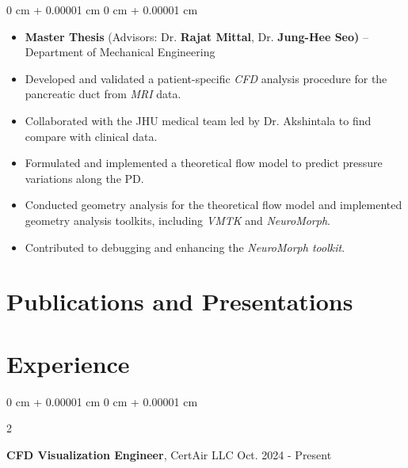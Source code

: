 \documentclass[10pt, letterpaper]{article}
\newenvironment{highlights}{
    \begin{itemize}[
        topsep=0.10 cm,
        parsep=0.10 cm,
        partopsep=0pt,
        itemsep=0pt,
        leftmargin=0 cm + 10pt
    ]
}{
    \end{itemize}
} %
\newenvironment{onecolentry}{
    \begin{adjustwidth}{
        0 cm + 0.00001 cm
    }{
        0 cm + 0.00001 cm
    }
}{
    \end{adjustwidth}
} %
\newenvironment{twocolentry}[2][]{
    \onecolentry
    \def\secondColumn{#2}
    \setcolumnwidth{\fill, 4.5 cm}
    \begin{paracol}{2}
}{ 
    \switchcolumn \raggedleft \secondColumn
    \end{paracol}
    \endonecolentry
} %
\begin{document}
    \vspace{0.10 cm}
    \begin{onecolentry}
        \begin{highlights}
            \item \textbf{Master Thesis} (Advisors: Dr. \textbf{Rajat Mittal}, Dr. \textbf{Jung-Hee Seo)} – Department of Mechanical Engineering
            \item Developed and validated a patient-specific \textit{CFD} analysis procedure for the pancreatic duct from \textit{MRI} data.
            \item Collaborated with the JHU medical team led by Dr. Akshintala to find compare with clinical data.
            \item Formulated and implemented a theoretical flow model to predict pressure variations along the PD.
            \item Conducted geometry analysis for the theoretical flow model and implemented geometry analysis toolkits, including \textit{VMTK} and \textit{NeuroMorph}.
            \item Contributed to debugging and enhancing the \textit{NeuroMorph toolkit}.
        \end{highlights}
    \end{onecolentry}
    
    
    
    
    
    
    
    
    

    \vspace{0.2 cm}

    \section{Publications and Presentations}
    




    \section{Experience}
        \begin{twocolentry}{
            Oct. 2024 - Present
        }
            \textbf{CFD Visualization Engineer}, CertAir LLC\end{twocolentry}
\end{document}
